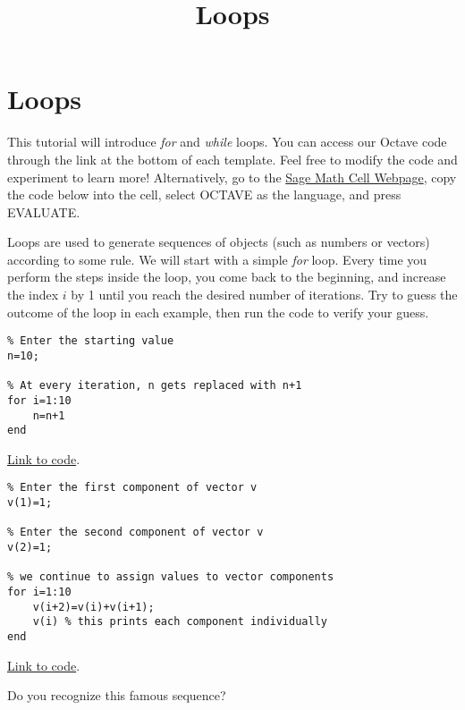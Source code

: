 \documentclass{ximera}
\title{Loops} \license{CC BY-NC-SA 4.0}
\begin{document}
\begin{abstract}
\end{abstract}
\maketitle
\section*{Loops}

This tutorial will introduce \emph{for} and \emph{while} loops. You can access our Octave code through the link at the bottom of each template.  Feel free to modify the code and experiment to learn more!  Alternatively, go to the \href{https://sagecell.sagemath.org/}{Sage Math Cell Webpage}, copy the code below into the cell, select OCTAVE as the language, and press EVALUATE.  

Loops are used to generate sequences of objects (such as numbers or vectors) according to some rule.  We will start with a simple \emph{for} loop.  Every time you perform the steps inside the loop, you come back to the beginning, and increase the index $i$ by 1 until you reach the desired number of iterations.  Try to guess the outcome of the loop in each example, then run the code to verify your guess.

\begin{example}\label{ex:loop1}
        \begin{verbatim}
% Enter the starting value
n=10;

% At every iteration, n gets replaced with n+1
for i=1:10
    n=n+1
end
    \end{verbatim}

\href{https://sagecell.sagemath.org/?z=eJwdyjEOglAQRdF-ktnDa6iw4LeSX1i4kB95wiRkMMOIcfcSb3lyO9w9GciF2LNFms842vqmitcyjCoqHW4JHowv7Jxb2uYXOGbmjuBrbQ9O-Fgu8L6oPLeA1XItgwrOvP6ZPv0AoF8hKw==&lang=octave&interacts=eJyLjgUAARUAuQ==}{Link to code}.    
\end{example}

\begin{example}\label{ex:loop2}
    \begin{verbatim}
% Enter the first component of vector v
v(1)=1;

% Enter the second component of vector v
v(2)=1;

% we continue to assign values to vector components
for i=1:10
    v(i+2)=v(i)+v(i+1);
    v(i) % this prints each component individually
end
    \end{verbatim}

\href{https://sagecell.sagemath.org/?z=eJx1jjEKwzAMRXeD76AlEJOl7tiQsQcxttwIUjnYiktvXwdKmqVapC_pfX4HdxbMIDNCpFwEfHquiZEFUoSKXlKGqlXtrZnsqJVW3Ykp6BOH_9D1B72wvbEQbwiSwJVCD4bqlg3Lvvhih1XRKjZNk73Zi1bQqvY0NMfWzLDP1ozHwUDXElGBNVODAZ2fT7mIA1UKm1uWt1bI4QOvKk6t&lang=octave&interacts=eJyLjgUAARUAuQ==}{Link to code}.   

Do you recognize this famous sequence?
\end{example}
\end{document}
